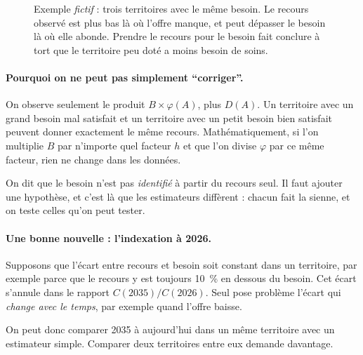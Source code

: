 \documentclass[11pt]{article}
\begin{document}
\begin{figure}[h]
\centering
{}
\caption{Exemple \emph{fictif} : trois territoires avec le même besoin. Le recours observé est plus bas là où l'offre
manque, et peut dépasser le besoin là où elle abonde. Prendre le recours pour le besoin fait conclure à tort que le
territoire peu doté a moins besoin de soins.}
\label{fig:recours}
\end{figure}

\paragraph{Pourquoi on ne peut pas simplement \enquote{corriger}.}
On observe seulement le produit $B \times \varphi(A)$, plus $D(A)$. Un territoire avec un grand besoin mal satisfait
et un territoire avec un petit besoin bien satisfait peuvent donner exactement le même recours. Mathématiquement, si
l'on multiplie $B$ par n'importe quel facteur $h$ et que l'on divise $\varphi$ par ce même facteur, rien ne change dans
les données.

On dit que le besoin n'est pas \emph{identifié} à partir du recours seul. Il faut ajouter une hypothèse, et c'est là
que les estimateurs diffèrent : chacun fait la sienne, et on teste celles qu'on peut tester.

\paragraph{Une bonne nouvelle : l'indexation à 2026.}
Supposons que l'écart entre recours et besoin soit constant dans un territoire, par exemple parce que le recours y est
toujours 10~\%\suppose{} en dessous du besoin. Cet écart s'annule dans le rapport $C(2035)/C(2026)$. Seul pose problème
l'écart qui \emph{change avec le temps}, par exemple quand l'offre baisse.

On peut donc comparer 2035 à aujourd'hui dans un même territoire avec un estimateur simple. Comparer deux territoires
entre eux demande davantage.
\end{document}
